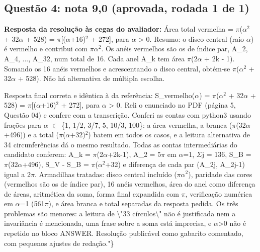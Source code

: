 \documentclass{article}%
\begin{document}
\subsection*{Questão 4: nota 9,0 (aprovada, rodada 1 de 1)}%
\textbf{Resposta da resolução às cegas do avaliador:} Área total vermelha = $\pi$($\alpha$$^2$ + 32$\alpha$ + 528) = $\pi${[}($\alpha$+16)$^2$ + 272{]}, para $\alpha$ > 0.\newline%
\newline%
Resumo: o disco central (raio $\alpha$) é vermelho e contribui com $\pi$$\alpha$$^2$. Os anéis vermelhos são os de índice par, A\_2, A\_4, ..., A\_32, num total de 16. Cada anel A\_k tem área $\pi$(2$\alpha$ + 2k - 1). Somando os 16 anéis vermelhos e acrescentando o disco central, obtém{-}se $\pi$($\alpha$$^2$ + 32$\alpha$ + 528). Não há alternativa de múltipla escolha.\par %
Resposta final correta e idêntica à da referência: S\_vermelho($\alpha$) = $\pi$($\alpha$$^2$ + 32$\alpha$ + 528) = $\pi${[}($\alpha$+16)$^2$ + 272{]}, para $\alpha$ > 0. Reli o enunciado no PDF (página 5, Questão 04) e confere com a transcrição. Conferi as contas com python3 usando frações para $\alpha$ $\in$ \{1, 1/2, 3/7, 5, 10/3, 100\}: a área vermelha, a branca ($\pi$(32$\alpha$+496)) e a total ($\pi$($\alpha$+32)$^2$) batem em todos os casos, e a leitura alternativa de 34 circunferências dá o mesmo resultado. Todas as contas intermediárias do candidato conferem: A\_k = $\pi$(2$\alpha$+2k-1), A\_2 = 5$\pi$ em $\alpha$=1, $\Sigma$j = 136, S\_B = $\pi$(32$\alpha$+496), S\_V - S\_B = $\pi$($\alpha$$^2$+32) e diferença de cada par (A\_2j, A\_2j-1) igual a 2$\pi$. Armadilhas tratadas: disco central incluído ($\pi$$\alpha$$^2$), paridade das cores (vermelhos são os de índice par), 16 anéis vermelhos, área do anel como diferença de áreas, aritmética da soma, forma final expandida com $\pi$, verificação numérica em $\alpha$=1 (561$\pi$), e área branca e total separadas da resposta pedida. Os três problemas são menores: a leitura de \textbackslash{}"33 círculos\textbackslash{}" não é justificada nem a invariância é mencionada, uma frase sobre a soma está imprecisa, e $\alpha$>0 não é repetido no bloco ANSWER. Resolução publicável como gabarito comentado, com pequenos ajustes de redação."\}%
\end{document}
